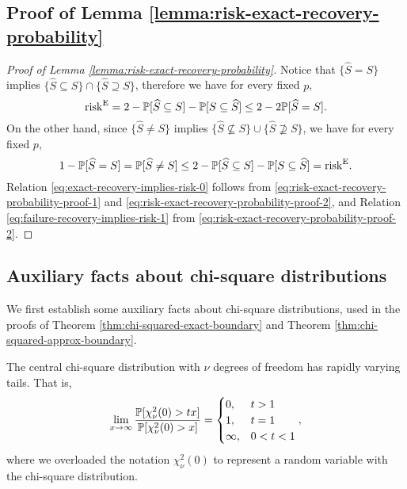

\subsection{Proof of Lemma \ref{lemma:risk-exact-recovery-probability}}

\begin{proof}[Proof of Lemma \ref{lemma:risk-exact-recovery-probability}]
Notice that $\{\widehat{S}=S\}$ implies $\{\widehat{S}\subseteq S\} \cap \{\widehat{S}\supseteq S\}$, therefore we have for every fixed $p$,
\begin{equation} \label{eq:risk-exact-recovery-probability-proof-1}
    \mathrm{risk}^{\mathrm{E}} 
    = 2 - \P[\widehat{S} \subseteq S] - \P[S \subseteq \widehat{S}] \\
    \le 2 - 2\P[\widehat{S}=S].
\end{equation}
On the other hand, since $\{\widehat{S}\neq S\}$ implies $\{\widehat{S}\not\subseteq S\} \cup \{\widehat{S}\not\supseteq S\}$, we have for every fixed $p$,
\begin{equation} \label{eq:risk-exact-recovery-probability-proof-2}
    1 - \P[\widehat{S}=S]
    = \P[\widehat{S}\neq S]
    \le 2 - \P[\widehat{S} \subseteq S] - \P[S \subseteq \widehat{S}]
    = \mathrm{risk}^{\mathrm{E}}. 
\end{equation}
Relation \eqref{eq:exact-recovery-implies-risk-0} follows from \eqref{eq:risk-exact-recovery-probability-proof-1} and \eqref{eq:risk-exact-recovery-probability-proof-2}, and Relation \eqref{eq:failure-recovery-implies-risk-1} from \eqref{eq:risk-exact-recovery-probability-proof-2}.
\end{proof}

\subsection{Auxiliary facts about chi-square distributions}

We first establish some auxiliary facts about chi-square distributions, used in the proofs of Theorem \ref{thm:chi-squared-exact-boundary} and Theorem \ref{thm:chi-squared-approx-boundary}.

\begin{lemma} \label{lemma:rapid-variation-chisq}
The central chi-square distribution with $\nu$ degrees of freedom has rapidly varying tails.
That is, 
\begin{equation} \label{eq:rapid-variation-chisq}
    \lim_{x\to\infty}\frac{\P[\chi_\nu^2(0)>tx]}{\P[\chi_\nu^2(0)>x]} = 
    \begin{cases}
    0, & t > 1 \\
    1, & t = 1 \\
    \infty, & 0 < t < 1
\end{cases},
\end{equation}
where we overloaded the notation $\chi_\nu^2(0)$ to represent a random variable with the chi-square distribution.
\end{lemma}

